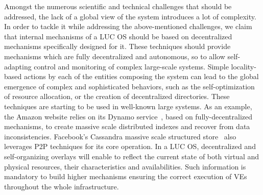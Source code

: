 Amongst the numerous scientific and technical challenges that should be addressed, 
the lack of a global view of the system introduces a lot
of complexity. In order to tackle it while addressing the above-mentioned
challenges, we claim that internal mechanisms of a LUC OS should be based
on decentralized mechanisms specifically designed for it.
These techniques should provide mechanisms which are fully decentralized and
autonomous, so to allow self-adapting control and monitoring of complex
large-scale systems. Simple locality-based actions by each of the entities
composing the system can lead to the global emergence of complex and
sophisticated behaviors, such as the self-optimization of resource allocation,
or the creation of decentralized directories. These techniques are starting to
be used in well-known large systems. As an example, the Amazon website relies on
its Dynamo service~\cite{decandia:2007}, based on fully-decentralized
mechanisms, to create massive scale distributed indexes and recover from data
inconsistencies. Facebook’s Cassandra massive scale structured
store~\cite{lakshman:2010} also leverages P2P techniques for its core
operation. 
%
In a LUC OS, decentralized and self-organizing overlays will enable to reflect
the current state of both virtual and physical resources, their characteristics and
availabilities. Such information is mandatory to build higher mechanisms ensuring the correct execution of VEs throughout 
the whole infrastructure. 
 

